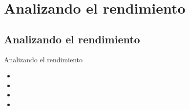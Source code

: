 \section{Analizando el rendimiento}

\subsection{Analizando el rendimiento}
\begin{frame}{Analizando el rendimiento}
  \begin{itemize}
    \item 
    \item 
    \item 
    \item 
  \end{itemize}
\end{frame}
